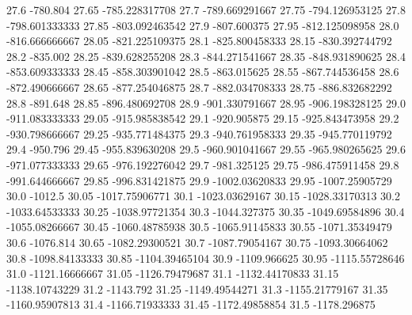            27.6         -780.804
          27.65   -785.228317708
           27.7   -789.669291667
          27.75   -794.126953125
           27.8   -798.601333333
          27.85   -803.092463542
           27.9      -807.600375
          27.95   -812.125098958
           28.0   -816.666666667
          28.05   -821.225109375
           28.1   -825.800458333
          28.15   -830.392744792
           28.2         -835.002
          28.25   -839.628255208
           28.3   -844.271541667
          28.35   -848.931890625
           28.4   -853.609333333
          28.45   -858.303901042
           28.5      -863.015625
          28.55   -867.744536458
           28.6   -872.490666667
          28.65   -877.254046875
           28.7   -882.034708333
          28.75   -886.832682292
           28.8         -891.648
          28.85   -896.480692708
           28.9   -901.330791667
          28.95   -906.198328125
           29.0   -911.083333333
          29.05   -915.985838542
           29.1      -920.905875
          29.15   -925.843473958
           29.2   -930.798666667
          29.25   -935.771484375
           29.3   -940.761958333
          29.35   -945.770119792
           29.4         -950.796
          29.45   -955.839630208
           29.5   -960.901041667
          29.55   -965.980265625
           29.6   -971.077333333
          29.65   -976.192276042
           29.7      -981.325125
          29.75   -986.475911458
           29.8   -991.644666667
          29.85   -996.831421875
           29.9   -1002.03620833
          29.95   -1007.25905729
           30.0          -1012.5
          30.05   -1017.75906771
           30.1   -1023.03629167
          30.15   -1028.33170313
           30.2   -1033.64533333
          30.25   -1038.97721354
           30.3     -1044.327375
          30.35   -1049.69584896
           30.4   -1055.08266667
          30.45   -1060.48785938
           30.5   -1065.91145833
          30.55   -1071.35349479
           30.6        -1076.814
          30.65   -1082.29300521
           30.7   -1087.79054167
          30.75   -1093.30664062
           30.8   -1098.84133333
          30.85   -1104.39465104
           30.9     -1109.966625
          30.95   -1115.55728646
           31.0   -1121.16666667
          31.05   -1126.79479687
           31.1   -1132.44170833
          31.15   -1138.10743229
           31.2        -1143.792
          31.25   -1149.49544271
           31.3   -1155.21779167
          31.35   -1160.95907813
           31.4   -1166.71933333
          31.45   -1172.49858854
           31.5     -1178.296875
